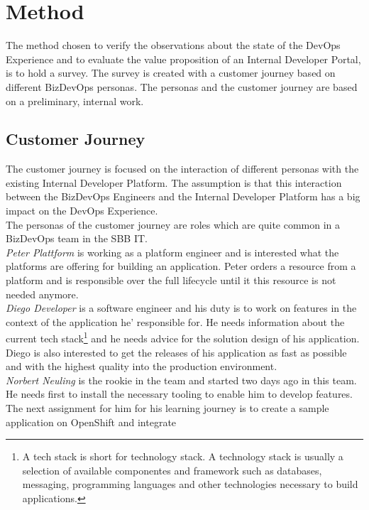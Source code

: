 \documentclass[a4paper,12pt]{article}
\begin{document}
    \section{Method}
    \label{sec:method}
    The method chosen to verify the observations about the state of the DevOps Experience and to evaluate the value proposition
    of an Internal Developer Portal, is to hold a survey.
    The survey is created with a customer journey based on different BizDevOps personas.
    The personas and the customer journey are based on a preliminary, internal work\parencite{sbbjobstobedone}.

    \subsection{Customer Journey}
    \label{subsec:cusjour}
    The customer journey is focused on the interaction of different personas with the existing Internal Developer Platform.
    The assumption is that this interaction between the BizDevOps Engineers and the Internal Developer Platform has a big
    impact on the DevOps Experience.\\
    The personas of the customer journey are roles which are quite common in a BizDevOps team in the SBB IT.\\
    \textit{Peter Plattform} is working as a platform engineer and is interested what the platforms are offering for building
    an application.
    Peter orders a resource from a platform and is responsible over the full lifecycle until it this resource is not
    needed anymore.\\
    \textit{Diego Developer} is a software engineer and his duty is to work on features in the context of the application
    he' responsible for.
    He needs information about the current tech stack\footnote{A tech stack is short for technology stack.
    A technology stack is usually a selection of available componentes and framework such as databases, messaging, programming
    languages and other technologies necessary to build applications.} and he needs advice for the solution design of his application.
    Diego is also interested to get the releases of his application as fast as possible and with the highest quality
    into the production environment.\\
    \textit{Norbert Neuling} is the rookie in the team and started two days ago in this team.
    He needs first to install the necessary tooling to enable him to develop features.
    The next assignment for him for his learning journey is to create a sample application on OpenShift and integrate
\end{document}
